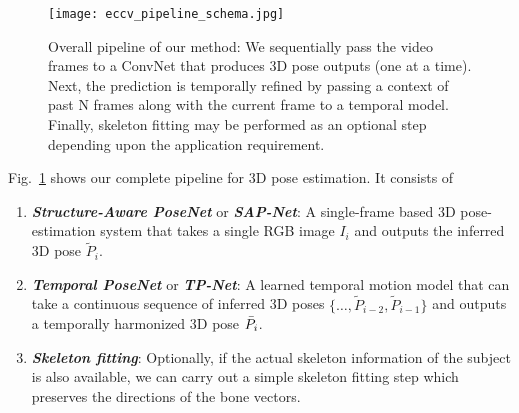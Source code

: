\documentclass[runningheads]{llncs}
\begin{document}
\begin{figure}[!h] 
	\centering
	\texttt{[image: eccv\_pipeline\_schema.jpg]}
    \caption{Overall pipeline of our method: We sequentially pass the video frames to a ConvNet that produces 3D pose outputs (one at a time). Next, the prediction is temporally refined by passing a context of past N frames along with the current frame to a temporal model. Finally, skeleton fitting may be performed as an optional step depending upon the application requirement.} 
	\vspace{-1em}
	\label{fig:pipeSchema}
\end{figure}


Fig.~\ref{fig:pipeSchema} shows our complete pipeline for 3D pose estimation. It consists of 
\begin{enumerate}
    \item \emph{\bf Structure-Aware PoseNet} or \emph{\bf SAP-Net}: A single-frame based 3D pose-estimation system that takes a single RGB image $I_i$ and outputs the inferred 3D pose $\tilde{P}_i$.
    
    \item \emph{\bf Temporal PoseNet} or \emph{\bf TP-Net}: A learned temporal motion model that can take a continuous sequence of inferred 3D poses $\{\ldots, \tilde{P}_{i-2}, \tilde{P}_{i-1}\}$ and outputs a temporally harmonized 3D pose $\Bar{P}_i$.
    
    \item \emph{\bf Skeleton fitting}: Optionally, if the actual skeleton information of the subject is also available, we can carry out a simple skeleton fitting step which preserves the directions of the bone vectors.
\end{enumerate}
\end{document}

